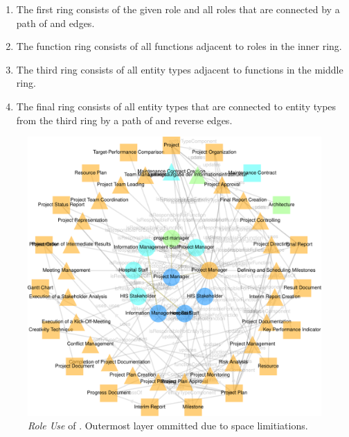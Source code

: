 \documentclass[conference]{IEEEtran}
\begin{document}
\begin{enumerate}[align=left, labelwidth=1ex]
\item The first ring consists of the given role and all roles that are connected by a path of  and  edges.
\item The function ring consists of all functions adjacent to roles in the inner ring.
\item The third ring consists of all entity types adjacent to functions in the middle ring.
\item The final ring consists of all entity types that are connected to entity types from the third ring by a path of  and reverse  edges.
\end{enumerate}
\begin{figure}[h!]
    \centering
    \includegraphics[width=0.6\linewidth]{class-use-project-manager.pdf}
    \caption{\emph{Role Use} of . Outermost layer ommitted due to space limitiations.}\label{fig:classuse}
\end{figure}

\end{document}

